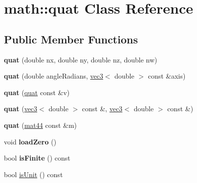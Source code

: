 \hypertarget{classmath_1_1quat}{
\section{math::quat Class Reference}
\label{classmath_1_1quat}
}
\subsection*{Public Member Functions}
\begin{DoxyCompactItemize}
\item 
\hypertarget{classmath_1_1quat_abd5d4e621692f255903b6774ded20d55}{
{\bfseries quat} (double nx, double ny, double nz, double nw)}
\label{classmath_1_1quat_abd5d4e621692f255903b6774ded20d55}

\item 
\hypertarget{classmath_1_1quat_a3c52efa70f7438fc36f5320e6c36b541}{
{\bfseries quat} (double angleRadians, \hyperlink{classmath_1_1vec3}{vec3}$<$ double $>$ const \&axis)}
\label{classmath_1_1quat_a3c52efa70f7438fc36f5320e6c36b541}

\item 
\hypertarget{classmath_1_1quat_adee27ee6bd123e700f938c4933e5193d}{
{\bfseries quat} (\hyperlink{classmath_1_1quat}{quat} const \&v)}
\label{classmath_1_1quat_adee27ee6bd123e700f938c4933e5193d}

\item 
\hypertarget{classmath_1_1quat_ab3c6f06cfc6ad9aab7bb34205dbbe9a2}{
{\bfseries quat} (\hyperlink{classmath_1_1vec3}{vec3}$<$ double $>$ const \&, \hyperlink{classmath_1_1vec3}{vec3}$<$ double $>$ const \&)}
\label{classmath_1_1quat_ab3c6f06cfc6ad9aab7bb34205dbbe9a2}

\item 
\hypertarget{classmath_1_1quat_ae4b41838614ed4470ede0f8895b844f1}{
{\bfseries quat} (\hyperlink{classmath_1_1mat44}{mat44} const \&m)}
\label{classmath_1_1quat_ae4b41838614ed4470ede0f8895b844f1}

\item 
\hypertarget{classmath_1_1quat_a40a99cdc7e0dd1325367cebfe08b98d7}{
void {\bfseries loadZero} ()}
\label{classmath_1_1quat_a40a99cdc7e0dd1325367cebfe08b98d7}

\item 
\hypertarget{classmath_1_1quat_a3246b760dcd8bc3ac5e46292659e8421}{
bool {\bfseries isFinite} () const }
\label{classmath_1_1quat_a3246b760dcd8bc3ac5e46292659e8421}

\item 
\hypertarget{classmath_1_1quat_a41549edf9f8204cc7a083c2db1940ad0}{
bool \hyperlink{classmath_1_1quat_a41549edf9f8204cc7a083c2db1940ad0}{isUnit} () const }
\label{classmath_1_1quat_a41549edf9f8204cc7a083c2db1940ad0}


\end{DoxyCompactItemize}
